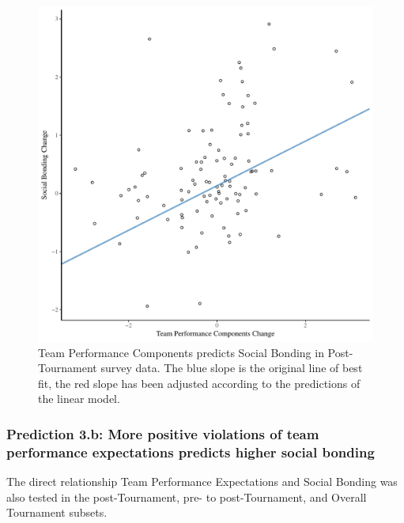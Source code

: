 \begin{CJK}{UTF8}{gbsn}
  

  \begin{figure}[htbp]
    \centering
  \includegraphics[scale=.5]{images/jasBondDeltaModelSlope.pdf}
    \caption{Team Performance Components predicts Social Bonding in Post-Tournament survey data. The blue slope is the original line of best fit, the red slope has been adjusted according to the predictions of the linear model.}
    \label{fig:jasBondDeltaModelSlope}
  \end{figure}









\subsubsection{Prediction 3.b: More positive violations of team performance expectations predicts higher social bonding}

The direct relationship Team Performance Expectations and Social Bonding was also tested in the post-Tournament, pre- to post-Tournament, and Overall Tournament subsets.


\end{CJK}
